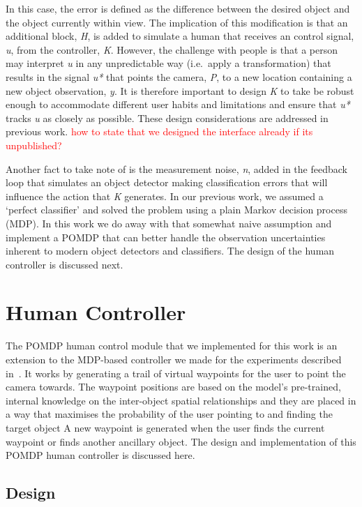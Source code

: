 \documentclass[runningheads]{llncs}
\newcommand\todo[1]{\textcolor{red}{#1}}
\begin{document}
In this case, the error is defined as the difference between the desired object and the object currently within view. 
The implication of this modification is that an additional block, \emph{H}, is added to simulate a human that receives an control signal, \emph{u}, from the controller, \emph{K}. 
However, the challenge with people is that a person may interpret \emph{u} in any unpredictable way (i.e.\ apply a transformation) that results in the signal \emph{u*} that points the camera, \emph{P}, to a new location containing a new object observation, \emph{y}.
It is therefore important to design \emph{K} to take be robust enough to accommodate different user habits and limitations and ensure that \emph{u*} tracks \emph{u} as closely as possible. 
These design considerations are addressed in previous work. \todo{how to state that we designed the interface already if its unpublished?}

Another fact to take note of is the measurement noise, \emph{n}, added in the feedback loop that simulates an object detector making classification errors that will influence the action that \emph{K} generates. 
In our previous work, we assumed a `perfect classifier' and solved the problem using a plain Markov decision process (MDP). 
In this work we do away with that somewhat naive assumption and implement a POMDP that can better handle the observation uncertainties inherent to modern object detectors and classifiers. 
The design of the human controller is discussed next. 

\section{Human Controller}

The POMDP human control module that we implemented for this work is an extension to the MDP-based controller we made for the experiments described in~\cite{lock2019active}.
It works by generating a trail of virtual waypoints for the user to point the camera towards.
The waypoint positions are based on the model's pre-trained, internal knowledge on the inter-object spatial relationships and they are placed in a way that maximises the probability of the user pointing to and finding the target object
A new waypoint is generated when the user finds the current waypoint or finds another ancillary object.
The design and implementation of this POMDP human controller is discussed here.

\subsection{Design}
\end{document}

